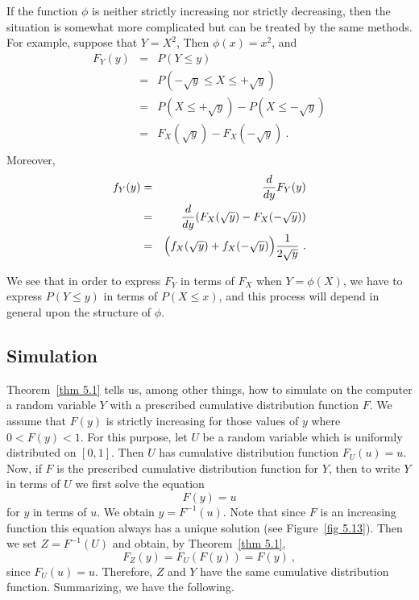 \par If the function $\phi$ is neither strictly increasing nor strictly decreasing,
then the situation is somewhat more complicated but can be treated by the same
methods. For example, suppose that $Y = X^2$,  Then $\phi(x) = x^2$, and
\begin{eqnarray*} F_Y(y) & = & P(Y \leq y) \\
       & = & P(-\sqrt y \leq X \leq +\sqrt y) \\
       & = & P(X \leq +\sqrt y) - P(X \leq -\sqrt y) \\
       & = & F_X(\sqrt y) - F_X(-\sqrt y)\ .\\
\end{eqnarray*} Moreover,
\begin{eqnarray*} f_Y(y) & = & \frac d{dy} F_Y(y) \\
       & = & \frac d{dy} (F_X(\sqrt y) - F_X(-\sqrt y)) \\
       & = & \Bigl(f_X(\sqrt y) + f_X(-\sqrt y)\Bigr) \frac 1{2\sqrt y}\ . \\
\end{eqnarray*}
\par 
We see that in order to express $F_Y$ in terms of $F_X$ when $Y =
\phi(X)$, we have to express $P(Y \leq y)$ in terms of $P(X \leq x)$, and this process
will depend in general upon the structure of $\phi$.
\subsection*{Simulation}
Theorem~\ref{thm 5.1} tells us, among other things, how to
simulate on the computer a random variable $Y$ with a prescribed cumulative distribution function
$F$.  We assume that $F(y)$ is strictly increasing for those values of $y$ where $0 <
F(y) < 1$.  For this purpose, let $U$ be a random variable which is uniformly
distributed on $[0, 1]$. Then $U$ has cumulative distribution function $F_U(u) = u$.  Now, if $F$
is the prescribed cumulative distribution function for $Y$, then to write $Y$ in terms of $U$ we
first solve the equation
$$ 
F(y) = u
$$ 
for $y$ in terms of $u$.  We obtain $y = F^{-1}(u)$.  Note that since $F$ is an
increasing function this equation always has a unique solution (see Figure~\ref{fig
5.13}).  Then we set $Z = F^{-1}(U)$ and obtain, by Theorem~\ref{thm 5.1},
$$ 
F_Z(y) = F_U(F(y)) = F(y)\ ,
$$ 
since $F_U(u) = u$.  Therefore, $Z$ and $Y$ have the same cumulative distribution function.  Summarizing,
we have the following.


